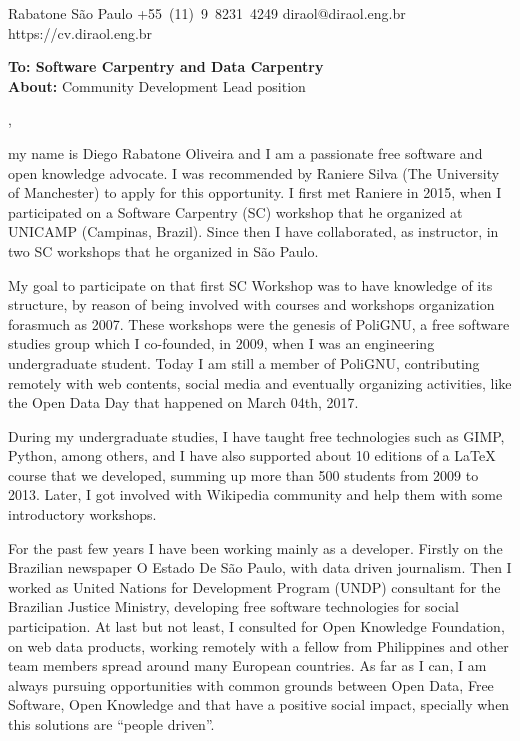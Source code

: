 \documentclass[11pt]{friggeri-cover-letter}
\begin{document}
\thispagestyle{empty}
%
%
       {Rabatone}
       {}
       {São Paulo}
       {}
       {+55~(11)~9~8231~4249}
       {diraol@diraol.eng.br}
       {https://cv.diraol.eng.br}

\textbf{To: Software Carpentry and Data Carpentry}\\
\textbf{About:} Community Development Lead position\\

\vfill

,

\vfill

my name is Diego Rabatone Oliveira and I am a passionate free software and open
knowledge advocate. I was recommended by Raniere Silva (The University of
Manchester) to apply for this opportunity. I first met Raniere in 2015, when I
participated on a Software Carpentry (SC) workshop that he organized at UNICAMP
(Campinas, Brazil). Since then I have collaborated, as instructor, in two SC
workshops that he organized in São Paulo.

\vfill

My goal to participate on that first SC Workshop was to have knowledge of its
structure, by reason of being involved with courses and workshops organization
forasmuch as 2007. These workshops were the genesis of PoliGNU, a free software
studies group which I co-founded, in 2009, when I was an engineering
undergraduate student. Today I am still a member of PoliGNU, contributing
remotely with web contents, social media and eventually organizing activities,
like the Open Data Day that happened on March 04th, 2017.

\vfill

During my undergraduate studies, I have taught free technologies such as GIMP,
Python, among others, and I have also supported about 10 editions of a LaTeX
course that we developed, summing up more than 500 students from 2009 to 2013.
Later, I got involved with Wikipedia community and help them with some
introductory workshops.

\vfill

For the past few years I have been working mainly as a developer. Firstly on
the Brazilian newspaper O Estado De São Paulo, with data driven journalism.
Then I worked as United Nations for Development Program (UNDP) consultant for
the Brazilian Justice Ministry, developing free software technologies for
social participation. At last but not least, I consulted for Open Knowledge
Foundation, on web data products, working remotely with a fellow from
Philippines and other team members spread around many European countries. As
far as I can, I am always pursuing opportunities with common grounds between
Open Data, Free Software, Open Knowledge and that have a positive social
impact, specially when this solutions are ``people driven''.
\end{document}

